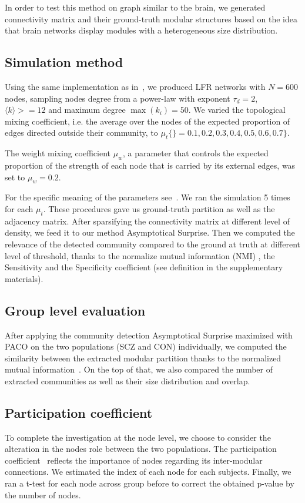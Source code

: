 In order to test this method on graph similar to the brain, we generated connectivity matrix and their ground-truth modular structures based on the idea that brain networks display modules with a heterogeneous size distribution.

\subsection{Simulation method}
Using the same implementation as in~\cite{lancichinetti2008}, we produced LFR networks with $N = 600$ nodes, sampling nodes degree from a power-law with exponent $\tau_d = 2$, $\langle k \rangle> = 12$ and maximum degree $\max(k_i) = 50$.
We varied the topological mixing coefficient, i.e. the average over the nodes of the expected proportion of edges directed outside their community, to $\mu_t \{\}= 0.1,0.2,0.3,0.4,0.5,0.6,0.7\}$.

The weight mixing coefficient $\mu_w$, a parameter that controls the expected proportion of the strength of each node that is carried by its external edges, was set to $\mu_w=0.2$.

For the specific meaning of the parameters see~\cite{lancichinetti2008,lancichinetti2009a}.
We ran the simulation 5 times for each $\mu_t$.
These procedures gave us ground-truth partition as well as the adjacency matrix. 
After sparsifying the connectivity matrix at different level of density, we feed it to our method Asymptotical Surprise.
Then we computed the relevance of the detected community compared to the ground at truth at different level of threshold, thanks to the normalize mutual information (NMI) , the Sensitivity and the Specificity coefficient (see definition in the supplementary materials).

\subsection{Group level evaluation}
After applying the community detection Asymptotical Surprise maximized with PACO on the two populations (SCZ and CON) individually, we computed the similarity between the extracted modular partition thanks to the normalized mutual information~\cite{danon2005}.
On the top of that, we also compared the number of extracted communities as well as their size distribution and overlap.

\subsection{Participation coefficient}
To complete the investigation at the node level, we choose to consider the alteration in the nodes role between the two populations.
The participation coefficient~\cite{guimera2005} reflects the importance of nodes regarding its inter-modular connections.
We estimated the index of each node for each subjects.
Finally, we ran a t-test for each node across group before to correct the obtained p-value by the number of nodes.
